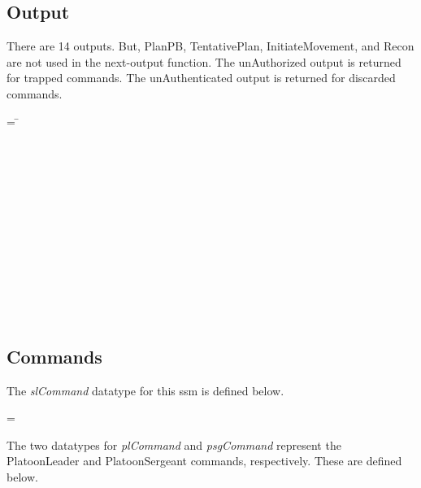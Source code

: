 \documentclass[../../main/main.tex]{subfiles}
\begin{document}
\subsection{Output}
There are 14 outputs.  But, PlanPB, TentativePlan, InitiateMovement, and Recon are not used in the next-output function.  The unAuthorized output is returned for trapped commands.  The unAuthenticated output is returned for discarded commands.

\begin{tabbing}
\parskip=8pt
 =  \= \\
					\>\HOLTokenBar{}  \\
					\>\HOLTokenBar{}  \\
					\>\HOLTokenBar{} \\
         				\>\HOLTokenBar{}  \\
					\>\HOLTokenBar{}  \\
					\>\HOLTokenBar{}  \\
					\>\HOLTokenBar{} \\
         				\>\HOLTokenBar{}  \\
					\>\HOLTokenBar{}  \\
					\>\HOLTokenBar{}  \\
					\>\HOLTokenBar{} \\
         				\>\HOLTokenBar{}  \\
					\>\HOLTokenBar{} 
\parskip=18pt
\end{tabbing}

\subsection{Commands}
The \textit{slCommand} datatype for this \gls{ssm} is defined below.

 =   \HOLTokenBar{}  

The two datatypes for \textit{plCommand} and \textit{psgCommand} represent the PlatoonLeader and PlatoonSergeant commands, respectively. These are defined below.
\end{document}
